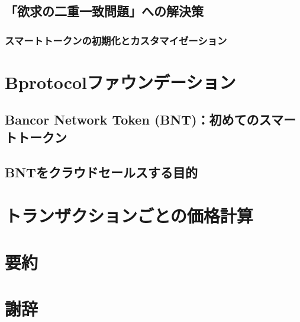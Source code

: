 \documentclass{jsarticle}
\begin{document}
  \subsection{「欲求の二重一致問題」への解決策}



    \subsubsection{スマートトークンの初期化とカスタマイゼーション}



\section{Bprotocolファウンデーション}



  \subsection{Bancor Network Token (BNT)：初めてのスマートトークン}



  \subsection{BNTをクラウドセールスする目的}



\section{トランザクションごとの価格計算}



\section{要約}



\section{謝辞}
\end{document}
